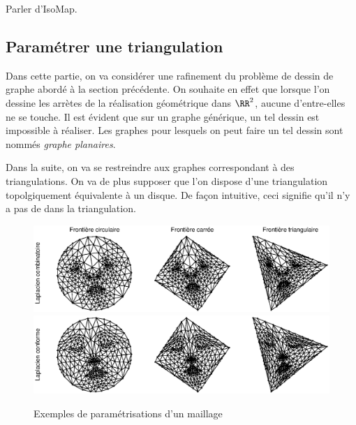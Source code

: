 \paraspace
Parler d'IsoMap.
\subsection{Paramétrer une triangulation}
\label{sect2-parametrer-triangulation} 


Dans cette partie, on va considérer une rafinement du problème de dessin de graphe abordé à la section précédente. On souhaite en effet que lorsque l'on dessine les arrètes de la réalisation géométrique dans $\RR^2$, aucune d'entre-elles ne se touche. Il est évident que sur un graphe générique, un tel dessin est impossible à réaliser. Les graphes pour lesquels on peut faire un tel dessin sont nommés \textit{graphe planaires}.

\paraspace
Dans la suite, on va se restreindre aux graphes correspondant à des triangulations. On va de plus supposer que l'on dispose d'une triangulation topolgiquement équivalente à un disque. De façon intuitive, ceci signifie qu'il n'y a pas de  dans la triangulation.

\paraspace
\begin{figure}[ht] 
    \begin{center}
    \includegraphics[scale=0.6]{images/graph-parameterization-1.eps}
    \includegraphics[scale=0.6]{images/graph-parameterization-2.eps}
    \end{center}
    \caption{Exemples de paramétrisations d'un maillage}
	 \label{fig-graph-parameterization}
\end{figure}

